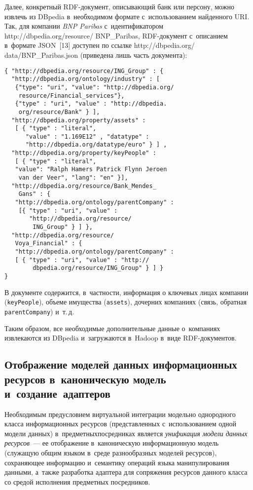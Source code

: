 \begin{multicols}{2}
      Далее, конкретный RDF-до\-ку\-мент, описывающий банк или персону, 
можно извлечь из \mbox{DBpedia} в~необходимом формате с~использованием 
найденного URI. Так, для компании \textit{BNP Paribas} с~идентификатором 
{\sf http://dbpedia.org/resource/ BNP\_Paribas}, RDF-до\-ку\-мент с~описанием 
в~формате JSON~[13] доступен по ссылке {\sf 
http://dbpedia.org/ data/BNP\_Paribas.json} (приведена лишь часть документа):
      {\small
      \begin{verbatim}
{ "http://dbpedia.org/resource/ING_Group" : { 
  "http://dbpedia.org/ontology/industry" : [ 
   {"type": "uri", "value": "http://dbpedia.org/
    resource/Financial_services"},
   {"type" : "uri", "value" : "http://dbpedia.
    org/resource/Bank" } ],
  "http://dbpedia.org/property/assets" : 
   [ { "type" : "literal", 
      "value" : "1.169E12" , "datatype" : 
      "http://dbpedia.org/datatype/euro" } ] ,
  "http://dbpedia.org/property/keyPeople" : 
   [ { "type" : "literal", 
   "value": "Ralph Hamers Patrick Flynn Jeroen
    van der Veer", "lang": "en" }],
  "http://dbpedia.org/resource/Bank_Mendes_
    Gans" : {
   "http://dbpedia.org/ontology/parentCompany" : 
    [{ "type" : "uri", "value" : 
       "http://dbpedia.org/resource/
        ING_Group" } ] },
  "http://dbpedia.org/resource/
   Voya_Financial" : {
   "http://dbpedia.org/ontology/parentCompany" : 
   [ { "type" : "uri", "value" : "http://
        dbpedia.org/resource/ING_Group" } ] }
}
\end{verbatim}
}

      В документе содержится, в~частности, информация о ключевых лицах 
компании (\verb"keyPeople"), объеме имущества (\verb"assets"), дочерних 
компаниях (связь, обратная \verb"parentCompany") и~т.\,д.
      
      Таким образом, все необходимые дополнительные данные о~компаниях 
извлекаются из DBpedia и~загружаются в~Hadoop в~виде RDF-до\-ку\-ментов.

\subsection{Отображение моделей данных информационных ресурсов 
в~каноническую модель и~создание~адаптеров}
      
      Необходимым предусловием виртуальной ин\-теграции модельно 
однородного класса ин\-фор\-мационных ресурсов (представленных 
с~использованием одной модели данных) в~предметных\linebreak посредниках является 
\textit{унификация модели данных ресурсов}~--- ее отображение 
в~каноническую информационную модель (служащую общим языком в~среде 
разнообразных моделей ресурсов), сохраняющее информацию и~семантику 
операций языка манипулирования данными, а~также разработка адаптера для 
сопряжения ресурсов данного класса со средой исполнения предметных 
посредников. 
      

\end{multicols}
